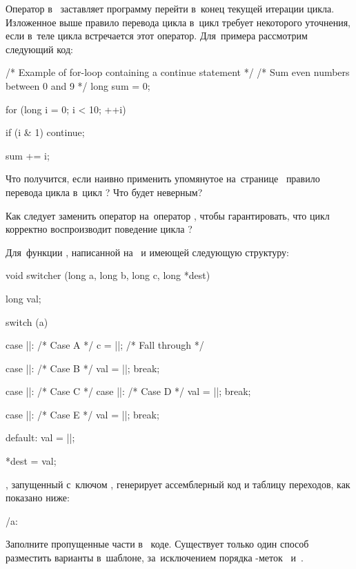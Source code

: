 \ExercisesSection
\begin{exercise}
\item\label{ex:forcontinue} Оператор  в~ заставляет программу перейти в~конец текущей итерации цикла. Изложенное выше правило перевода цикла  в~цикл  требует некоторого уточнения, если в~теле цикла встречается этот оператор. Для~примера рассмотрим следующий код:

\begin{ccode}
/* Example of for-loop containing a continue statement */
/* Sum even numbers between 0 and 9 */
long sum = 0;

for (long i = 0; i < 10; ++i)
{
  if (i & 1)
    continue;

  sum += i;
}
\end{ccode}

\begin{enumIssue}
\item Что получится, если наивно применить упомянутое на~странице~\pageref{sect:for} правило перевода цикла  в~цикл ? Что будет неверным?
%
\item Как следует заменить оператор  на~оператор , чтобы гарантировать, что цикл  корректно воспроизводит поведение цикла ?
\end{enumIssue}


\item Для~функции , написанной на~ и имеющей следующую структуру:

{\newcommand*{\ans}{\ansfw{7.5em}}%
%
\begin{ccode}
void switcher (long a, long b, long c, long *dest)
{
  long val;

  switch (a)
  {
  case |\ans{5}|:      /* Case A */
    c = |\ans{b \textasciicircum 15}|;
    /* Fall through */

  case |\ans{0}|:      /* Case B */
    val = |\ans{c + 112}|;
    break;

  case |\ans{2}|:      /* Case C */
  case |\ans{7}|:      /* Case D */
    val = |\ans{(b + c) << 2}|;
    break;

  case |\ans{4}|:      /* Case E */
    val = |\ans{a}|;
    break;

  default:
    val = |\ans{b}|;
  }

  *dest = val;
}
\end{ccode}
}

\GCC{}, запущенный с~ключом , генерирует ассемблерный код и таблицу переходов, как показано ниже:\label{ex:jumptable}

\precomment/a: %
\vspace{-0.6\baselineskip}

Заполните пропущенные части в~ коде. Существует только один способ разместить варианты в~шаблоне, за~исключением порядка -меток~ и~.

\end{exercise}
